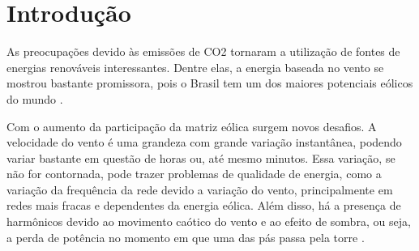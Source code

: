 

\makeindex




	\begingroup
	\chapter{Introdução}
	\endgroup
	
	\setcounter{page}{1}
	
	As preocupações devido às emissões de CO2 tornaram a utilização de fontes de energias renováveis interessantes. Dentre elas, a energia baseada no vento se mostrou bastante promissora, pois o Brasil tem um dos maiores potenciais eólicos do mundo \cite{atlaseolico}.
	
	Com o aumento da participação da matriz eólica surgem novos desafios. A velocidade do vento é uma grandeza com grande variação instantânea, podendo variar bastante em questão de horas ou, até mesmo minutos. Essa variação, se não for contornada, pode trazer problemas de qualidade de energia, como a variação da frequência da rede devido a variação do vento, principalmente em redes mais fracas e dependentes da energia eólica. Além disso, há a presença de harmônicos devido ao movimento caótico do vento e ao efeito de sombra, ou seja, a perda de potência no momento em que uma das pás passa pela torre \cite{pintofundamentos}.
	
